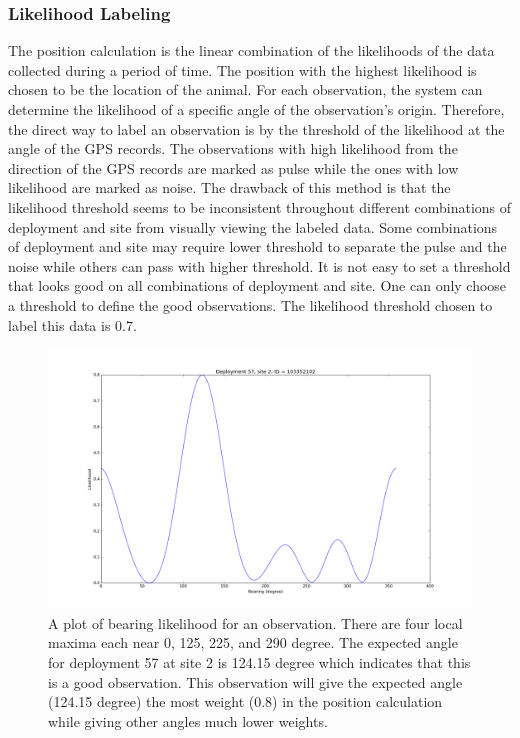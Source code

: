 \documentclass[twoside]{article}
\begin{document}
\subsubsection{Likelihood Labeling}
The position calculation is the linear combination of the likelihoods of the data collected during a period of time. The position with the highest likelihood is chosen to be the location of the animal. For each observation, the system can determine the likelihood of a specific angle of the observation's origin. Therefore, the direct way to label an observation is by the threshold of the likelihood at the angle of the GPS records. The observations with high likelihood from the direction of the GPS records are marked as pulse while the ones with low likelihood are marked as noise. The drawback of this method is that the likelihood threshold seems to be inconsistent throughout different combinations of deployment and site from visually viewing the labeled data. Some combinations of deployment and site may require lower threshold to separate the pulse and the noise while others can pass with higher threshold. It is not easy to set a threshold that looks good on all combinations of deployment and site. One can only choose a threshold to define the good observations. The likelihood threshold chosen to label this data is 0.7.
\begin{figure}[h]
\centering
\includegraphics[width=\textwidth]{bearingPlot}
\caption{A plot of bearing likelihood for an observation. There are four local maxima each near 0, 125, 225, and 290 degree. The expected angle for deployment 57 at site 2 is 124.15 degree which indicates that this is a good observation. This observation will give the expected angle (124.15 degree) the most weight (0.8) in the position calculation while giving other angles much lower weights.}
\end{figure}
\end{document}
